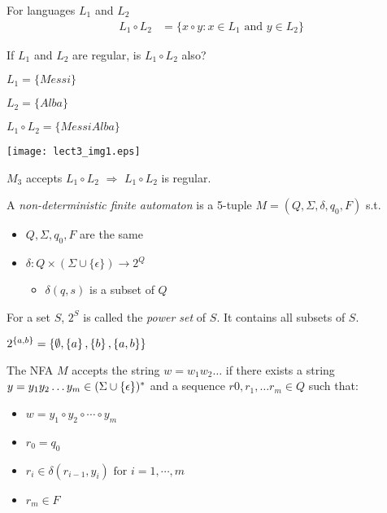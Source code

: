 \begin{definition}
    For languages $L_1$ and $L_2$
    \begin{align*}
        L_1 \circ L_2 &= \{x \circ y: x \in L_1 \text{ and } y \in L_2\}
    \end{align*}
\end{definition}

If $L_1$ and $L_2$ are regular, is $L_1 \circ L_2$ also?

$L_1 = \{Messi\}$

$L_2 = \{Alba\}$

$L_1 \circ L_2 = \{MessiAlba\}$

\begin{unnumfigure}
    \texttt{[image: lect3\_img1.eps]}
\end{unnumfigure}

$M_3$ accepts $L_1 \circ L_2$ $\Rightarrow$ $L_1 \circ L_2$ is regular.

\begin{definition}
    A \emph{non-deterministic finite automaton} is a 5-tuple $M = (Q, \Sigma, \delta, q_0, F)$ s.t.

    \begin{itemize}
        \item $Q, \Sigma, q_0, F$ are the same
        \item $\delta: Q \times (\Sigma \cup \{\epsilon\}) \rightarrow 2^Q$
        \begin{itemize}
            \item $\delta (q, s)$ is a subset of $Q$
        \end{itemize}
    \end{itemize}
\end{definition}

For a set $S$, $2^S$ is called the \emph{power set} of $S$. It contains all subsets of $S$.

$2^{\left \{ a, b \right \}} = \left \{ \emptyset, \left \{ a \right \}, \left \{ b \right \}, \left \{ a, b \right \} \right \}$

\begin{definition}
    The NFA $M$ accepts the string  $w = w_1w_2 \ldots$ if there exists a string $y = y_1y_2 \ldots y_m \in (\Sigma \cup \left \{ \epsilon \right \})^*$  and a sequence $r0, r_1, \ldots r_m \in Q$ such that:

    \begin{itemize}
        \item $w = y_1 \circ y_2 \circ \cdots \circ y_m$
        \item $r_0 = q_0$
        \item $r_i \in \delta (r_{i-1}, y_i) \text{ for } i = 1, \cdots, m$
        \item $r_m \in F$
    \end{itemize}
\end{definition}

